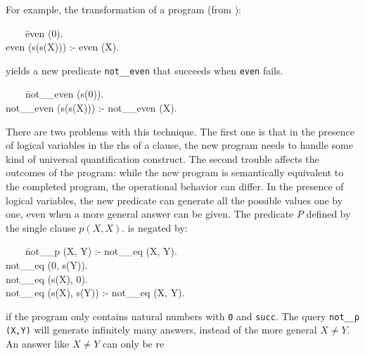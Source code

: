 \documentclass[]{llncs}
\newenvironment{mytabbing}
   {\vspace{0.3em}\begin{small}\begin{tabbing}}
   {\end{tabbing}\end{small}\vspace{0.3em}}
\begin{document}
For example, the transformation of a program (from \cite{Barbuti1}):
\begin{tt}
\begin{mytabbing}
~~~~\= even (0). \\
    \> even (s(s(X))) :- even (X).
\end{mytabbing}
\end{tt}
yields a new predicate {\tt not\_\_even}
that succeeds when {\tt even} fails.

\begin{tt}
\begin{mytabbing}
~~~~\= not\_\_even (s(0)). \\
    \> not\_\_even (s(s(X))) :- not\_\_even (X).
\end{mytabbing}
\end{tt}

There are two problems with this technique. The first one is
that in the presence of logical variables in the rhs of
a clause, the new program needs to handle some kind of universal
quantification construct. The second trouble affects the outcomes of
the program: while the
new program is semantically equivalent to the completed program,
the operational behavior can differ. In the presence of
logical variables, the new predicate can generate all the
possible values one by one, even when a more general answer
can be given. The predicate $P$ defined by the single
clause $p(X, X).$ is negated by:


\begin{tt}
\begin{mytabbing}
~~~~\= not\_\_p (X, Y) :- not\_\_eq (X, Y). \\
    \> not\_\_eq (0, s(Y)). \\
    \> not\_\_eq (s(X), 0). \\
    \> not\_\_eq (s(X), s(Y)) :- not\_\_eq (X, Y).
\end{mytabbing}
\end{tt}
\noindent
if the program only contains natural numbers with {\tt 0} and {\tt succ}.
The query \linebreak
{\tt not\_\_p (X,Y)} will generate infinitely many answers,
instead of the more general $X \neq Y$. An answer like $X \neq Y$ can only be re
\end{document}
